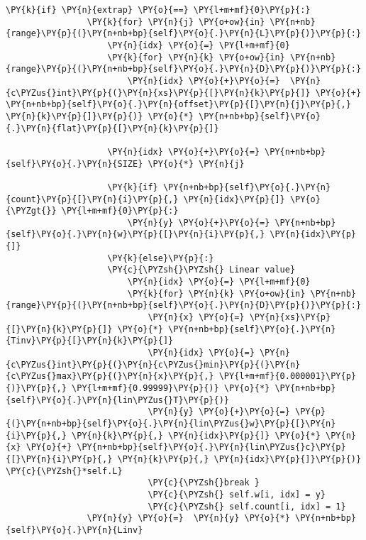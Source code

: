 \begin{Verbatim}[commandchars=\\\{\}]
            \PY{k}{if} \PY{n}{extrap} \PY{o}{==} \PY{l+m+mf}{0}\PY{p}{:}
                \PY{k}{for} \PY{n}{j} \PY{o+ow}{in} \PY{n+nb}{range}\PY{p}{(}\PY{n+nb+bp}{self}\PY{o}{.}\PY{n}{L}\PY{p}{)}\PY{p}{:}
                    \PY{n}{idx} \PY{o}{=} \PY{l+m+mf}{0}
                    \PY{k}{for} \PY{n}{k} \PY{o+ow}{in} \PY{n+nb}{range}\PY{p}{(}\PY{n+nb+bp}{self}\PY{o}{.}\PY{n}{D}\PY{p}{)}\PY{p}{:}
                        \PY{n}{idx} \PY{o}{+}\PY{o}{=}  \PY{n}{c\PYZus{}int}\PY{p}{(}\PY{n}{xs}\PY{p}{[}\PY{n}{k}\PY{p}{]} \PY{o}{+} \PY{n+nb+bp}{self}\PY{o}{.}\PY{n}{offset}\PY{p}{[}\PY{n}{j}\PY{p}{,} \PY{n}{k}\PY{p}{]}\PY{p}{)} \PY{o}{*} \PY{n+nb+bp}{self}\PY{o}{.}\PY{n}{flat}\PY{p}{[}\PY{n}{k}\PY{p}{]}
                    
                    \PY{n}{idx} \PY{o}{+}\PY{o}{=} \PY{n+nb+bp}{self}\PY{o}{.}\PY{n}{SIZE} \PY{o}{*} \PY{n}{j}
                    
                    \PY{k}{if} \PY{n+nb+bp}{self}\PY{o}{.}\PY{n}{count}\PY{p}{[}\PY{n}{i}\PY{p}{,} \PY{n}{idx}\PY{p}{]} \PY{o}{\PYZgt{}} \PY{l+m+mf}{0}\PY{p}{:}
                        \PY{n}{y} \PY{o}{+}\PY{o}{=} \PY{n+nb+bp}{self}\PY{o}{.}\PY{n}{w}\PY{p}{[}\PY{n}{i}\PY{p}{,} \PY{n}{idx}\PY{p}{]}
                    \PY{k}{else}\PY{p}{:}
                    \PY{c}{\PYZsh{}\PYZsh{} Linear value}
                        \PY{n}{idx} \PY{o}{=} \PY{l+m+mf}{0}
                        \PY{k}{for} \PY{n}{k} \PY{o+ow}{in} \PY{n+nb}{range}\PY{p}{(}\PY{n+nb+bp}{self}\PY{o}{.}\PY{n}{D}\PY{p}{)}\PY{p}{:}
                            \PY{n}{x} \PY{o}{=} \PY{n}{xs}\PY{p}{[}\PY{n}{k}\PY{p}{]} \PY{o}{*} \PY{n+nb+bp}{self}\PY{o}{.}\PY{n}{Tinv}\PY{p}{[}\PY{n}{k}\PY{p}{]}
                            \PY{n}{idx} \PY{o}{=} \PY{n}{c\PYZus{}int}\PY{p}{(}\PY{n}{c\PYZus{}min}\PY{p}{(}\PY{n}{c\PYZus{}max}\PY{p}{(}\PY{n}{x}\PY{p}{,} \PY{l+m+mf}{0.000001}\PY{p}{)}\PY{p}{,} \PY{l+m+mf}{0.99999}\PY{p}{)} \PY{o}{*} \PY{n+nb+bp}{self}\PY{o}{.}\PY{n}{lin\PYZus{}T}\PY{p}{)}
                            \PY{n}{y} \PY{o}{+}\PY{o}{=} \PY{p}{(}\PY{n+nb+bp}{self}\PY{o}{.}\PY{n}{lin\PYZus{}w}\PY{p}{[}\PY{n}{i}\PY{p}{,} \PY{n}{k}\PY{p}{,} \PY{n}{idx}\PY{p}{]} \PY{o}{*} \PY{n}{x} \PY{o}{+} \PY{n+nb+bp}{self}\PY{o}{.}\PY{n}{lin\PYZus{}c}\PY{p}{[}\PY{n}{i}\PY{p}{,} \PY{n}{k}\PY{p}{,} \PY{n}{idx}\PY{p}{]}\PY{p}{)} \PY{c}{\PYZsh{}*self.L}
                            \PY{c}{\PYZsh{}break }
                            \PY{c}{\PYZsh{} self.w[i, idx] = y}
                            \PY{c}{\PYZsh{} self.count[i, idx] = 1}
                \PY{n}{y} \PY{o}{=}  \PY{n}{y} \PY{o}{*} \PY{n+nb+bp}{self}\PY{o}{.}\PY{n}{Linv}


\end{Verbatim}
